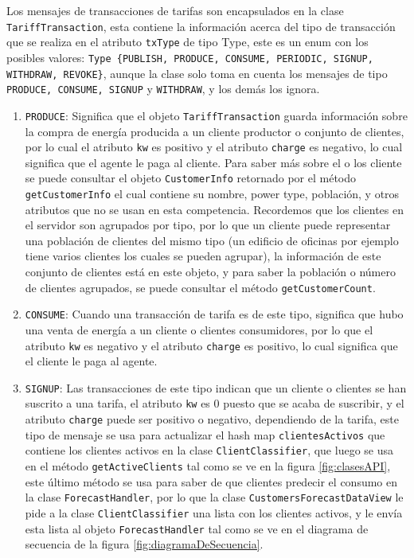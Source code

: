 Los mensajes de transacciones de tarifas son encapsulados en la clase \texttt{TariffTransaction}, esta contiene la información acerca del tipo de transacción que se realiza en el atributo \texttt{txType} de tipo Type, este es un enum con los posibles valores:  \texttt{Type \{PUBLISH, PRODUCE, CONSUME, PERIODIC, SIGNUP, WITHDRAW, REVOKE\}}, aunque la clase solo toma en cuenta los mensajes de tipo \texttt{PRODUCE, CONSUME, SIGNUP} y \texttt{WITHDRAW}, y los demás los ignora.
\renewcommand{\labelenumi}{$\bullet$ }
\begin{enumerate}
	\item \texttt{PRODUCE}: Significa que el objeto \texttt{TariffTransaction} guarda información sobre la compra de energía producida a un cliente productor o conjunto de clientes, por lo cual el atributo \texttt{kw} es positivo y el atributo \texttt{charge} es negativo, lo cual significa que el agente le paga al cliente. Para saber más sobre el o los cliente se puede consultar el objeto \texttt{CustomerInfo} retornado por el método \texttt{getCustomerInfo} el cual contiene su nombre, power type, población, y otros atributos que no se usan en esta competencia. Recordemos que los clientes en el servidor son agrupados por tipo, por lo que un cliente puede representar una población de clientes del mismo tipo (un edificio de oficinas por ejemplo tiene varios clientes los cuales se pueden agrupar), la información de este conjunto de clientes está en este objeto, y para saber la población o número de clientes agrupados, se puede consultar el método \texttt{getCustomerCount}.
	
	 \item \texttt{CONSUME}: Cuando una transacción de tarifa es de este tipo, significa que hubo una venta de energía a un cliente o clientes consumidores,  por lo que el atributo \texttt{kw} es negativo y el atributo \texttt{charge} es positivo, lo cual significa que el cliente le paga al agente.
	
	\item \texttt{SIGNUP}: Las transacciones de este tipo indican que un cliente o clientes se han suscrito a una tarifa, el atributo \texttt{kw}	 es 0 puesto que se acaba de suscribir, y el atributo \texttt{charge} puede ser positivo o negativo, dependiendo de la tarifa, este tipo de mensaje se usa para actualizar el hash map \texttt{clientesActivos} que contiene los clientes activos en la clase \texttt{ClientClassifier}, que luego se usa en el método \texttt{getActiveClients} tal como se ve en la figura \ref{fig:clasesAPI}, este último método se usa para saber de que clientes predecir el consumo en la clase \texttt{ForecastHandler}, por lo que la clase \texttt{CustomersForecastDataView} le pide a la clase \texttt{ClientClassifier} una lista con los clientes activos, y le envía esta lista al objeto \texttt{ForecastHandler} tal como se ve en el diagrama de secuencia de la figura \ref{fig:diagramaDeSecuencia}.
	

\end{enumerate}
